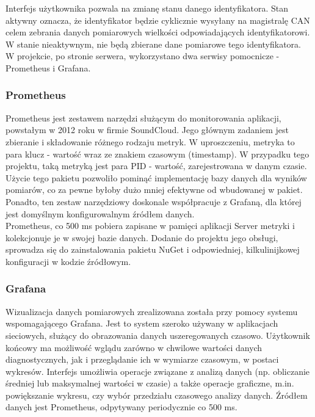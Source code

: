 \documentclass[10pt,a4paper]{article}
\begin{document}
		Interfejs użytkownika pozwala na zmianę stanu danego identyfikatora. Stan aktywny oznacza, że identyfikator będzie cyklicznie wysyłany na magistralę CAN celem zebrania danych pomiarowych wielkości odpowiadających identyfikatorowi. W stanie nieaktywnym, nie będą zbierane dane pomiarowe tego identyfikatora.\\		
		W projekcie, po stronie serwera, wykorzystano dwa serwisy pomocnicze - Prometheus i Grafana.
		
		\subsubsection{Prometheus}
		Prometheus jest zestawem narzędzi służącym do monitorowania aplikacji, powstałym w 2012 roku w firmie SoundCloud. Jego głównym zadaniem jest zbieranie i składowanie różnego rodzaju metryk. W uproszczeniu, metryka to para klucz - wartość wraz ze znakiem czasowym (timestamp). W przypadku tego projektu, taką metryką jest para PID - wartość, zarejestrowana w danym czasie. Użycie tego pakietu pozwoliło pominąć implementację bazy danych dla wyników pomiarów, co za pewne byłoby dużo mniej efektywne od wbudowanej w pakiet. Ponadto, ten zestaw narzędziowy doskonale współpracuje z Grafaną, dla której jest domyślnym konfigurowalnym źródłem danych.\\
		Prometheus, co 500 ms pobiera zapisane w pamięci aplikacji Server metryki i kolekcjonuje je w swojej bazie danych. Dodanie do projektu jego obsługi, sprowadza się do zainstalowania pakietu NuGet i odpowiedniej, kilkulinijkowej konfiguracji w kodzie źródłowym.
		
		\subsubsection{Grafana}
		Wizualizacja danych pomiarowych zrealizowana została przy pomocy systemu wspomagającego Grafana. Jest to system szeroko używany w aplikacjach sieciowych, służący do obrazowania danych uszeregowanych czasowo. Użytkownik końcowy ma możliwość wglądu zarówno w chwilowe wartości danych diagnostycznych, jak i przeglądanie ich w wymiarze czasowym, w postaci wykresów. Interfejs umożliwia operacje związane z analizą danych (np. obliczanie średniej lub maksymalnej wartości w czasie) a także operacje graficzne, m.in. powiększanie wykresu, czy wybór przedziału czasowego analizy danych. Źródłem danych jest Prometheus, odpytywany periodycznie co 500 ms.
		
\end{document}
